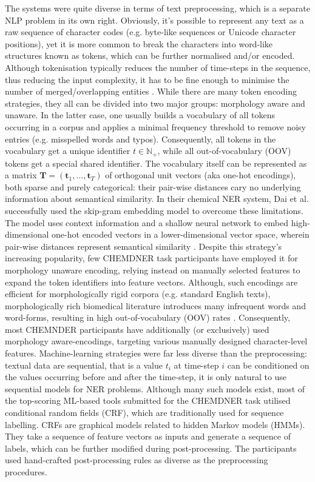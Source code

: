 \documentclass[twocolumn]{bmcart}%
\begin{document}
The systems were quite diverse in terms of text preprocessing, which is a separate NLP problem in its own right.
Obviously, it's possible to represent any text as a raw sequence of character codes (e.g. byte-like sequences or Unicode character positions), yet it is more common to break the characters into word-like structures known as tokens, which can be further normalised and/or encoded.
Although tokenisation typically reduces the number of time-steps in the sequence, thus reducing the input complexity, it has to be fine enough to minimise the number of merged/overlapping entities \cite{Dai2015, Lu2015}.
While there are many token encoding strategies, they all can be divided into two major groups: morphology aware and unaware. 
In the latter case, one usually builds a vocabulary of all tokens occurring in a corpus and applies a minimal frequency threshold to remove noisy entries (e.g. misspelled words and typos).
Consequently, all tokens in the vocabulary get a unique identifier $t \in {\mathbb{N}}_{+}$, while all out-of-vocabulary (OOV) tokens get a special shared identifier.
The vocabulary itself can be represented as a matrix $\mathbf{T} = ( {\mathbf{t}}_{1}, \dots, {\mathbf{t}}_{T} )$ of orthogonal unit vectors (aka one-hot encodings), both sparse and purely categorical: their pair-wise distances cary no underlying information about semantical similarity.
In their chemical NER system, Dai et al. \cite{Lu2015} successfully used the skip-gram embedding model to overcome these limitations. 
The model uses context information and a shallow neural network to embed high-dimensional one-hot encoded vectors in a lower-dimensional vector space, wherein pair-wise distances represent semantical similarity \cite{Mikolov2013a, Mikolov2013}.
Despite this strategy's increasing popularity, few CHEMDNER task participants have employed it for morphology unaware encoding, relying instead on manually selected features to expand the token identifiers into feature vectors.
Although, such encodings are efficient for morphologically rigid corpora (e.g. standard English texts), morphologically rich biomedical literature introduces many infrequent words and word-forms, resulting in high out-of-vocabulary (OOV) rates \cite{Bojanowski2016, Wieting2016}.
Consequently, most CHEMNDER participants have additionally (or exclusively) used morphology aware-encodings, targeting various manually designed character-level features.
Machine-learning strategies were far less diverse than the preprocessing: textual data are sequential, that is a value ${t}_{i}$ at time-step ${i}$ can be conditioned on the values occurring before and after the time-step, it is only natural to use sequential models for NER problems.
Although many such models exist, most of the top-scoring ML-based tools submitted for the CHEMDNER task utilised conditional random fields (CRF), which are traditionally used for sequence labelling.
CRFs are graphical models related to hidden Markov models (HMMs). 
They take a sequence of feature vectors as inputs and generate a sequence of labels, which can be further modified during post-processing.
The participants used hand-crafted post-processing rules as diverse as the preprocessing procedures.
\end{document}
